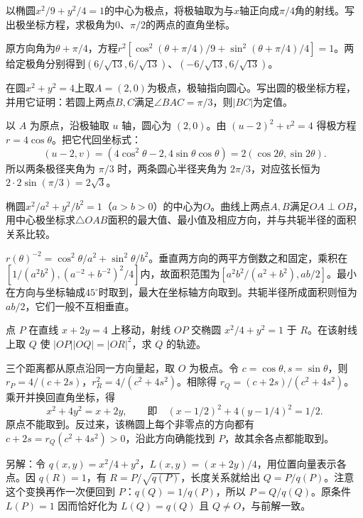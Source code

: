 以椭圆\(x^2/9+y^2/4=1\)的中心为极点，将极轴取为与\(x\)轴正向成\(\pi/4\)角的射线。写出极坐标方程，求极角为\(0\)、\(\pi/2\)的两点的直角坐标。
\par
\solutionanswer
原方向角为\(\theta+\pi/4\)，方程\(r^2[\cos^2(\theta+\pi/4)/9+\sin^2(\theta+\pi/4)/4]=1\)。两给定极角分别得到\((6/\sqrt{13},6/\sqrt{13})\)、\((-6/\sqrt{13},6/\sqrt{13})\)。


在圆\(x^2+y^2=4\)上取\(A=(2,0)\)为极点，极轴指向圆心。写出圆的极坐标方程，并用它证明：若圆上两点\(B,C\)满足\(\angle BAC=\pi/3\)，则\(|BC|\)为定值。
\par
\solutionanswer
以 \(A\) 为原点，沿极轴取 \(u\) 轴，圆心为 \((2,0)\)。由 \((u-2)^2+v^2=4\) 得极方程 \(r=4\cos\theta\)。把它代回坐标式：
\[
 (u-2,v)=(4\cos^2\theta-2,4\sin\theta\cos\theta)=2(\cos2\theta,\sin2\theta).
\]
所以两条极径夹角为 \(\pi/3\) 时，两条圆心半径夹角为 \(2\pi/3\)，对应弦长恒为 \(2\cdot2\sin(\pi/3)=2\sqrt3\)。


椭圆\(x^2/a^2+y^2/b^2=1\)（\(a>b>0\)）的中心为\(O\)。曲线上两点\(A,B\)满足\(OA\perp OB\)，用中心极坐标求\(\triangle OAB\)面积的最大值、最小值及相应方向，并与共轭半径的面积关系比较。
\par
\solutionanswer
\(r(\theta)^{-2}=\cos^2\theta/a^2+\sin^2\theta/b^2\)。垂直两方向的两平方倒数之和固定，乘积在\([1/(a^2b^2),(a^{-2}+b^{-2})^2/4]\)内，故面积范围为\([a^2b^2/(a^2+b^2),ab/2]\)。最小在方向与坐标轴成\(45^\circ\)时取到，最大在坐标轴方向取到。共轭半径所成面积则恒为\(ab/2\)，它们一般不互相垂直。


点 \(P\) 在直线 \(x+2y=4\) 上移动，射线 \(OP\) 交椭圆 \(x^2/4+y^2=1\) 于 \(R\)。在该射线上取 \(Q\) 使 \(|OP||OQ|=|OR|^2\)，求 \(Q\) 的轨迹。
\par
\solutionanswer
三个距离都从原点沿同一方向量起，取 \(O\) 为极点。令 \(c=\cos\theta,s=\sin\theta\)，则 \(r_P=4/(c+2s)\)，\(r_R^2=4/(c^2+4s^2)\)。相除得 \(r_Q=(c+2s)/(c^2+4s^2)\)。乘开并换回直角坐标，得
\[
 x^2+4y^2=x+2y,\qquad\text{即}\quad (x-1/2)^2+4(y-1/4)^2=1/2.
\]
原点不能取到。反过来，该椭圆上每个非零点的方向都有 \(c+2s=r_Q(c^2+4s^2)>0\)，沿此方向确能找到 \(P\)，故其余各点都能取到。

另解：令 \(q(x,y)=x^2/4+y^2\)，\(L(x,y)=(x+2y)/4\)，用位置向量表示各点。因 \(q(R)=1\)，有 \(R=P/\sqrt{q(P)}\)，长度关系就给出 \(Q=P/q(P)\)。注意这个变换再作一次便回到 \(P\)：\(q(Q)=1/q(P)\)，所以 \(P=Q/q(Q)\)。原条件 \(L(P)=1\) 因而恰好化为 \(L(Q)=q(Q)\) 且 \(Q\ne O\)，与前解一致。


